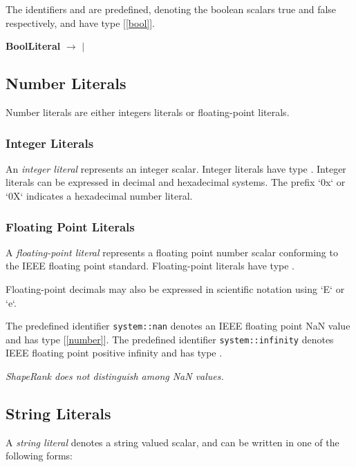 \documentclass{article}
\begin{document}
The identifiers \TRUE{} and \FALSE{} are predefined,  denoting the boolean scalars true and false respectively, and have type \BOOL{} [\ref{bool}].

{\bf BoolLiteral} $\rightarrow$ \TRUE{} $|$ \FALSE{}

\subsection{Number Literals}
\label{numberLiterals}

Number literals are either integers literals or floating-point literals.

\NumberLiteral{}

\subsubsection{Integer Literals}
\label{integerLiterals}

An {\em integer literal} represents an integer scalar.  Integer literals have type \INT{}.
Integer literals can be expressed in decimal and hexadecimal systems. The prefix `0x` or `0X` indicates a hexadecimal number literal. 

\subsubsection{Floating Point Literals}
\label{floatingPointLiterals}

A {\em floating-point literal} represents a floating point number scalar conforming to the IEEE floating point standard. Floating-point literals have type \FLOAT{}.

Floating-point decimals may also be expressed in scientific notation using `E` or `e`.

The predefined identifier {\tt system::nan}  denotes an IEEE floating point NaN value and has type \FLOAT{} 
[\ref{number}].
The predefined identifier {\tt system::infinity} denotes IEEE floating point positive infinity and has type \FLOAT{}.

{\em
ShapeRank does not distinguish among NaN values.
}


\subsection{String Literals}
\label{stringLiterals}

A {\em string literal} denotes a string valued scalar, and can be written in one of the following forms:
\end{document}
